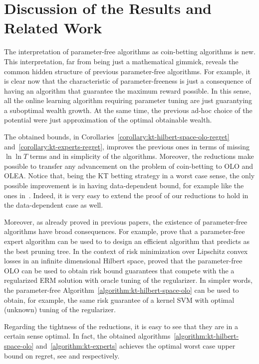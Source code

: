 \section{Discussion of the Results and Related Work}
\label{sec:discussion}

The interpretation of parameter-free algorithms as coin-betting algorithms is new. This interpretation, far from being just a mathematical gimmick, reveals the common hidden structure of previous parameter-free algorithms. For example, it is clear now that the characteristic of parameter-freeness is just a consequence of having an algorithm that guarantee the maximum reward possible. In this sense, all the online learning algorithm requiring parameter tuning are just guarantying a suboptimal wealth growth. At the same time, the previous ad-hoc choice of the potential were just approximation of the optimal obtainable wealth.

The obtained bounds, in Corollaries~\ref{corollary:kt-hilbert-space-olo-regret} and~\ref{corollary:kt-experts-regret}, improves the previous ones in terms of missing $\ln \ln T$ terms and in simplicity of the algorithms. Moreover, the reductions make possible to transfer any advancement on the problem of coin-betting to \ac{OLO} and \ac{OLEA}. Notice that, being the \ac{KT} betting strategy in a worst case sense, the only possible improvement is in having data-dependent bound, for example like the ones in~\cite{KoolenE15}. Indeed, it is very easy to extend the proof of our reductions to hold in the data-dependent case as well.

Moreover, as already proved in previous papers, the existence of parameter-free algorithms have broad consequences. For example, \citet{LuoS15} prove that a parameter-free expert algorithm can be used to to design an efficient algorithm that predicts as the best pruning tree. In the context of risk minimization over Lipschitz convex losses in an infinite dimensional Hilbert space, \citet{Orabona14} proved that the parameter-free \ac{OLO} can be used to obtain risk bound guarantees that compete with the a regularized \ac{ERM} solution with oracle tuning of the regularizer. In simpler words, the parameter-free Algorithm~\ref{algorithm:kt-hilbert-space-olo} can be used to obtain, for example, the same risk guarantee of a kernel \ac{SVM} with optimal (unknown) tuning of the regularizer.

Regarding the tightness of the reductions, it is easy to see that they are in a certain sense optimal. In fact, the obtained algorithms~\ref{algorithm:kt-hilbert-space-olo} and~\ref{algorithm:kt-experts} achieves the optimal worst case upper bound on regret, see \citet{Orabona13} and \citet{} respectively.

